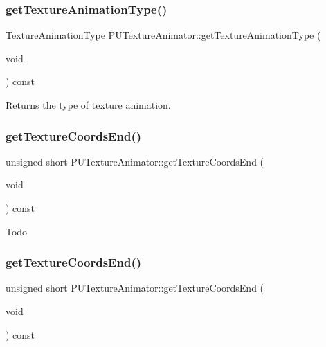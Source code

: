 \subsubsection{\texorpdfstring{get\+Texture\+Animation\+Type()}{getTextureAnimationType()}\hspace{0.1cm}{\footnotesize\ttfamily [2/2]}}
{\footnotesize\ttfamily Texture\+Animation\+Type P\+U\+Texture\+Animator\+::get\+Texture\+Animation\+Type (\begin{DoxyParamCaption}\item[{void}]{ }\end{DoxyParamCaption}) const}

Returns the type of texture animation. \mbox{\label{classPUTextureAnimator_ada75476207f3dd94b93c0420b48e5fdc}} 
\subsubsection{\texorpdfstring{get\+Texture\+Coords\+End()}{getTextureCoordsEnd()}\hspace{0.1cm}{\footnotesize\ttfamily [1/2]}}
{\footnotesize\ttfamily unsigned short P\+U\+Texture\+Animator\+::get\+Texture\+Coords\+End (\begin{DoxyParamCaption}\item[{void}]{ }\end{DoxyParamCaption}) const}

Todo \mbox{\label{classPUTextureAnimator_ada75476207f3dd94b93c0420b48e5fdc}} 
\subsubsection{\texorpdfstring{get\+Texture\+Coords\+End()}{getTextureCoordsEnd()}\hspace{0.1cm}{\footnotesize\ttfamily [2/2]}}
{\footnotesize\ttfamily unsigned short P\+U\+Texture\+Animator\+::get\+Texture\+Coords\+End (\begin{DoxyParamCaption}\item[{void}]{ }\end{DoxyParamCaption}) const}

